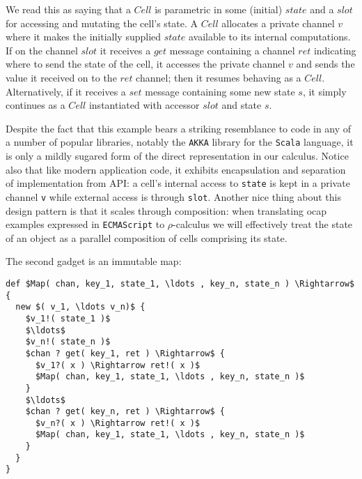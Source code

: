 \documentclass[]{amsart}
\theoremstyle{definition}
\theoremstyle{remark}
\numberwithin{equation}{subsection}
\newcommand{\rhoc}{$\rho$-calculus}
\begin{document}

We read this as saying that a $Cell$ is parametric in some (initial)
$state$ and a $slot$ for accessing and mutating the cell's state. A
$Cell$ allocates a private channel $v$ where it makes the initially
supplied $state$ available to its internal computations. If on the
channel $slot$ it receives a $get$ message containing a channel $ret$
indicating where to send the state of the cell, it accesses the
private channel $v$ and sends the value it received on to the $ret$
channel; then it resumes behaving as a $Cell$. Alternatively, if it
receives a $set$ message containing some new state $s$, it simply
continues as a $Cell$ instantiated with accessor $slot$ and state $s$.

Despite the fact that this example bears a striking resemblance to code
in any of a number of popular libraries, notably the {\tt AKKA}
library for the {\tt Scala} language, it is only a mildly sugared
form of the direct representation in our calculus. Notice also that
like modern application code, it exhibits encapsulation and separation
of implementation from API: a cell's internal access to
{\tt state} is kept in a private channel {\tt v} while
external access is through {\tt slot}. Another nice thing about
this design pattern is that it scales through composition: when
translating ocap examples expressed in {\tt ECMAScript} to \rhoc\;
we will effectively treat the state of an object as a parallel
composition of cells comprising its state.

The second gadget is an immutable map:

\pagebreak

\begin{lstlisting}[mathescape]
def $Map( chan, key_1, state_1, \ldots , key_n, state_n ) \Rightarrow$ {
  new $( v_1, \ldots v_n)$ {
    $v_1!( state_1 )$
    $\ldots$
    $v_n!( state_n )$
    $chan ? get( key_1, ret ) \Rightarrow$ { 
      $v_1?( x ) \Rightarrow ret!( x )$
      $Map( chan, key_1, state_1, \ldots , key_n, state_n )$
    }
    $\ldots$
    $chan ? get( key_n, ret ) \Rightarrow$ { 
      $v_n?( x ) \Rightarrow ret!( x )$
      $Map( chan, key_1, state_1, \ldots , key_n, state_n )$
    }
  }
}
\end{lstlisting}
\end{document}
